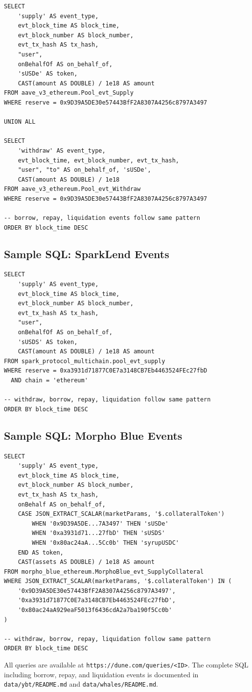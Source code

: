 \begin{verbatim}
SELECT 
    'supply' AS event_type,
    evt_block_time AS block_time,
    evt_block_number AS block_number,
    evt_tx_hash AS tx_hash,
    "user",
    onBehalfOf AS on_behalf_of,
    'sUSDe' AS token,
    CAST(amount AS DOUBLE) / 1e18 AS amount
FROM aave_v3_ethereum.Pool_evt_Supply
WHERE reserve = 0x9D39A5DE30e57443BfF2A8307A4256c8797A3497

UNION ALL

SELECT 
    'withdraw' AS event_type,
    evt_block_time, evt_block_number, evt_tx_hash,
    "user", "to" AS on_behalf_of, 'sUSDe',
    CAST(amount AS DOUBLE) / 1e18
FROM aave_v3_ethereum.Pool_evt_Withdraw
WHERE reserve = 0x9D39A5DE30e57443BfF2A8307A4256c8797A3497

-- borrow, repay, liquidation events follow same pattern
ORDER BY block_time DESC
\end{verbatim}

\subsection*{Sample SQL: SparkLend Events}

\begin{verbatim}
SELECT 
    'supply' AS event_type,
    evt_block_time AS block_time,
    evt_block_number AS block_number,
    evt_tx_hash AS tx_hash,
    "user",
    onBehalfOf AS on_behalf_of,
    'sUSDS' AS token,
    CAST(amount AS DOUBLE) / 1e18 AS amount
FROM spark_protocol_multichain.pool_evt_supply
WHERE reserve = 0xa3931d71877C0E7a3148CB7Eb4463524FEc27fbD
  AND chain = 'ethereum'

-- withdraw, borrow, repay, liquidation follow same pattern
ORDER BY block_time DESC
\end{verbatim}

\subsection*{Sample SQL: Morpho Blue Events}

\begin{verbatim}
SELECT 
    'supply' AS event_type,
    evt_block_time AS block_time,
    evt_block_number AS block_number,
    evt_tx_hash AS tx_hash,
    onBehalf AS on_behalf_of,
    CASE JSON_EXTRACT_SCALAR(marketParams, '$.collateralToken')
        WHEN '0x9D39A5DE...7A3497' THEN 'sUSDe'
        WHEN '0xa3931d71...27fbD' THEN 'sUSDS'
        WHEN '0x80ac24aA...5Cc0b' THEN 'syrupUSDC'
    END AS token,
    CAST(assets AS DOUBLE) / 1e18 AS amount
FROM morpho_blue_ethereum.MorphoBlue_evt_SupplyCollateral
WHERE JSON_EXTRACT_SCALAR(marketParams, '$.collateralToken') IN (
    '0x9D39A5DE30e57443BfF2A8307A4256c8797A3497',
    '0xa3931d71877C0E7a3148CB7Eb4463524FEc27fbD',
    '0x80ac24aA929eaF5013f6436cdA2a7ba190f5Cc0b'
)

-- withdraw, borrow, repay, liquidation follow same pattern
ORDER BY block_time DESC
\end{verbatim}

All queries are available at \texttt{https://dune.com/queries/<ID>}. The complete SQL including borrow, repay, and liquidation events is documented in \texttt{data/ybt/README.md} and \texttt{data/whales/README.md}.
